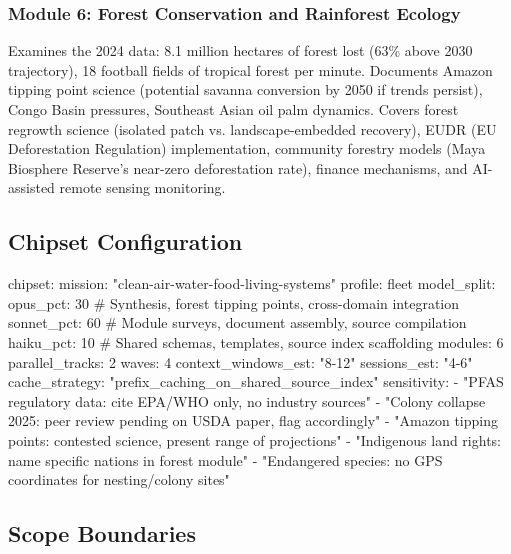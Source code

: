 \documentclass[11pt,letterpaper]{article}
\begin{document}
\subsubsection{Module 6: Forest Conservation and Rainforest Ecology}
Examines the 2024 data: 8.1 million hectares of forest lost (63\% above 2030 trajectory), 18 football fields of tropical forest per minute. Documents Amazon tipping point science (potential savanna conversion by 2050 if trends persist), Congo Basin pressures, Southeast Asian oil palm dynamics. Covers forest regrowth science (isolated patch vs. landscape-embedded recovery), EUDR (EU Deforestation Regulation) implementation, community forestry models (Maya Biosphere Reserve's near-zero deforestation rate), finance mechanisms, and AI-assisted remote sensing monitoring.

\subsection{Chipset Configuration}

\begin{asciibox}
chipset:
  mission: "clean-air-water-food-living-systems"
  profile: fleet
  model_split:
    opus_pct: 30        # Synthesis, forest tipping points, cross-domain integration
    sonnet_pct: 60      # Module surveys, document assembly, source compilation
    haiku_pct: 10       # Shared schemas, templates, source index scaffolding
  modules: 6
  parallel_tracks: 2
  waves: 4
  context_windows_est: "8-12"
  sessions_est: "4-6"
  cache_strategy: "prefix_caching_on_shared_source_index"
  sensitivity:
    - "PFAS regulatory data: cite EPA/WHO only, no industry sources"
    - "Colony collapse 2025: peer review pending on USDA paper, flag accordingly"
    - "Amazon tipping points: contested science, present range of projections"
    - "Indigenous land rights: name specific nations in forest module"
    - "Endangered species: no GPS coordinates for nesting/colony sites"
\end{asciibox}

\subsection{Scope Boundaries}
\end{document}
